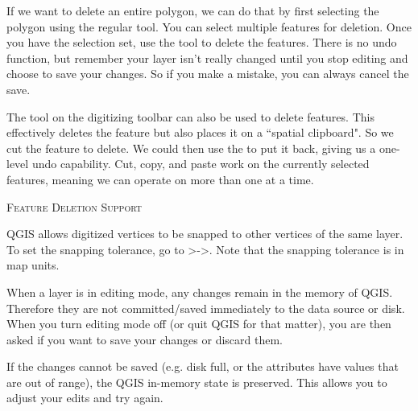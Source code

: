 
If we want to delete an entire polygon, we can do that by first selecting 
the polygon using the regular  tool. You can select 
multiple features for deletion. Once you have the selection set, use the 
 tool to delete the features. There is no undo function, 
but remember your layer isn't really changed until you stop editing and choose 
to save your changes. So if you make a mistake, you can always cancel the save.

The  tool on the digitizing toolbar can
also be used to delete features. This effectively deletes the feature but
also places it on a ``spatial clipboard". So we cut the feature to delete. 
We could then use the  to put it back, giving us a one-level undo 
capability. Cut, copy, and paste work on the currently selected features, 
meaning we can operate on more than one at a time.

\begin{Tip}[ht]\caption{\textsc{Feature Deletion Support}}
\end{Tip}

QGIS allows digitized vertices to be snapped to other vertices of the same layer. To 
set the snapping tolerance, go to
>->.
Note that the snapping tolerance is in map units.


When a layer is in editing mode, any changes remain in the memory of QGIS.
Therefore they are not committed/saved immediately to the data source or disk.
When you turn editing mode off (or quit QGIS for that matter), 
you are then asked if you want to save your
changes or discard them.

If the changes cannot be saved (e.g. disk full, or the attributes have
values that are out of range), the QGIS in-memory state is preserved.  This
allows you to adjust your edits and try again.

